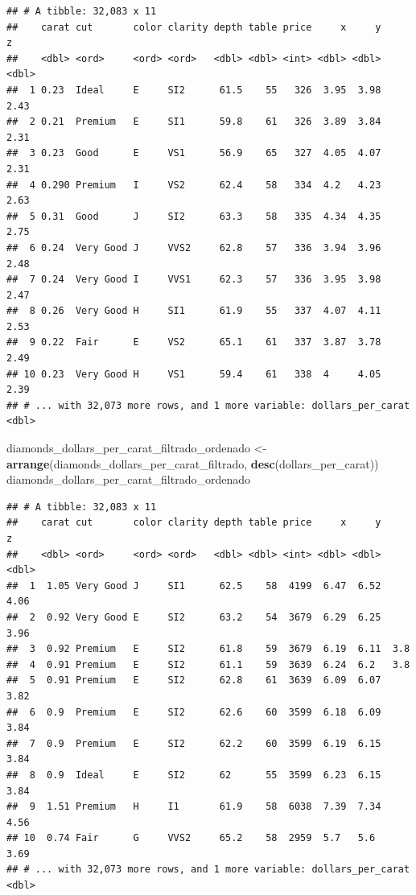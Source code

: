 \documentclass[]{book}
\newenvironment{Shaded}{\begin{snugshade}}{\end{snugshade}}
\newcommand{\KeywordTok}[1]{\textcolor[rgb]{0.13,0.29,0.53}{\textbf{#1}}}
\newcommand{\StringTok}[1]{\textcolor[rgb]{0.31,0.60,0.02}{#1}}
\newcommand{\NormalTok}[1]{#1}
\theoremstyle{definition}
\theoremstyle{definition}
\theoremstyle{definition}
\theoremstyle{remark}
\begin{document}
\begin{verbatim}
## # A tibble: 32,083 x 11
##    carat cut       color clarity depth table price     x     y     z
##    <dbl> <ord>     <ord> <ord>   <dbl> <dbl> <int> <dbl> <dbl> <dbl>
##  1 0.23  Ideal     E     SI2      61.5    55   326  3.95  3.98  2.43
##  2 0.21  Premium   E     SI1      59.8    61   326  3.89  3.84  2.31
##  3 0.23  Good      E     VS1      56.9    65   327  4.05  4.07  2.31
##  4 0.290 Premium   I     VS2      62.4    58   334  4.2   4.23  2.63
##  5 0.31  Good      J     SI2      63.3    58   335  4.34  4.35  2.75
##  6 0.24  Very Good J     VVS2     62.8    57   336  3.94  3.96  2.48
##  7 0.24  Very Good I     VVS1     62.3    57   336  3.95  3.98  2.47
##  8 0.26  Very Good H     SI1      61.9    55   337  4.07  4.11  2.53
##  9 0.22  Fair      E     VS2      65.1    61   337  3.87  3.78  2.49
## 10 0.23  Very Good H     VS1      59.4    61   338  4     4.05  2.39
## # ... with 32,073 more rows, and 1 more variable: dollars_per_carat <dbl>
\end{verbatim}

\begin{Shaded}
\begin{Highlighting}[]
\NormalTok{diamonds_dollars_per_carat_filtrado_ordenado <-}\StringTok{ }\KeywordTok{arrange}\NormalTok{(diamonds_dollars_per_carat_filtrado, }\KeywordTok{desc}\NormalTok{(dollars_per_carat))}
\NormalTok{diamonds_dollars_per_carat_filtrado_ordenado}
\end{Highlighting}
\end{Shaded}

\begin{verbatim}
## # A tibble: 32,083 x 11
##    carat cut       color clarity depth table price     x     y     z
##    <dbl> <ord>     <ord> <ord>   <dbl> <dbl> <int> <dbl> <dbl> <dbl>
##  1  1.05 Very Good J     SI1      62.5    58  4199  6.47  6.52  4.06
##  2  0.92 Very Good E     SI2      63.2    54  3679  6.29  6.25  3.96
##  3  0.92 Premium   E     SI2      61.8    59  3679  6.19  6.11  3.8 
##  4  0.91 Premium   E     SI2      61.1    59  3639  6.24  6.2   3.8 
##  5  0.91 Premium   E     SI2      62.8    61  3639  6.09  6.07  3.82
##  6  0.9  Premium   E     SI2      62.6    60  3599  6.18  6.09  3.84
##  7  0.9  Premium   E     SI2      62.2    60  3599  6.19  6.15  3.84
##  8  0.9  Ideal     E     SI2      62      55  3599  6.23  6.15  3.84
##  9  1.51 Premium   H     I1       61.9    58  6038  7.39  7.34  4.56
## 10  0.74 Fair      G     VVS2     65.2    58  2959  5.7   5.6   3.69
## # ... with 32,073 more rows, and 1 more variable: dollars_per_carat <dbl>
\end{verbatim}
\end{document}
